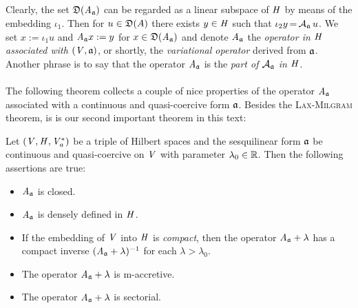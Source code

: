 \documentclass[11pt,twoside]{article}
\begin{document}
\subparagraph*{}
Clearly,
the set $\mathfrak{D}(\mathit{A}_{\mathfrak{a}})$ can be regarded as a linear subspace
of $\mathit{H}$ by means of the embedding $\iota_1$.
Then for $u \in \mathfrak{D}(A)$ there exists $y \in \mathit{H}$
such that $\iota_2 y {\,=\,} {{\mathcal{A}}_{\mathfrak{a}}} \, u$.
We set $x := \iota_1 u$ and $\mathit{A}_{\mathfrak{a}} x := y$
for $x \in \mathfrak{D}(\mathit{A}_{\mathfrak{a}})$
and denote $\mathit{A}_{\mathfrak{a}}$
the \textit{operator in $\mathit{H}$ associated with $(\mathit{V},\mathfrak{a})$},
or shortly,
the \textit{variational operator} derived from $\mathfrak{a}$.
Another phrase is to say that
the operator $\mathit{A}_{\mathfrak{a}}$ is the \textit{part of ${{\mathcal{A}}_{\mathfrak{a}}}$ in $\mathit{H}$}.

\paragraph*{} %
The following theorem collects a couple of nice properties 
of the operator $\mathit{A}_{\mathfrak{a}}$
associated with a continuous and quasi-coercive form $\mathfrak{a}$.
Besides the \textsc{Lax-Milgram} theorem,
is is our second important theorem in this text:

\begin{theorem}\label{QUASI-COERCIVE_FORMS_AND_ASSOCIATED_OPERATORS}
Let $(\mathit{V},\mathit{H},\mathit{V}_a^*)$ be a triple of Hilbert spaces
and the sesquilinear form $\mathfrak{a}$ be continuous and quasi-coercive
on $\mathit{V}$ with parameter $\lambda_0 \in {\mathbb{R}}$.
Then the following assertions are true:

\begin{itemize}[leftmargin=9mm]
\item[(a)]
$\mathit{A}_{\mathfrak{a}}$ is closed.

\item[(b)]
$\mathit{A}_{\mathfrak{a}}$ is densely defined in $\mathit{H}$.

\item[(c)]
If the embedding of $\mathit{V}$ into $\mathit{H}$ is \textit{compact},
then the operator $\mathit{A}_{\mathfrak{a}} + \lambda$ has a compact inverse
$(\mathit{A}_{\mathfrak{a}} +\lambda)^{-1}$ for each $\lambda > \lambda_0$.

\item[(d)]
The operator $\mathit{A}_{\mathfrak{a}} + \lambda$ is m-accretive.

\item[(e)]
The operator $\mathit{A}_{\mathfrak{a}} + \lambda$ is sectorial.
\end{itemize}
\end{theorem}
\end{document}
